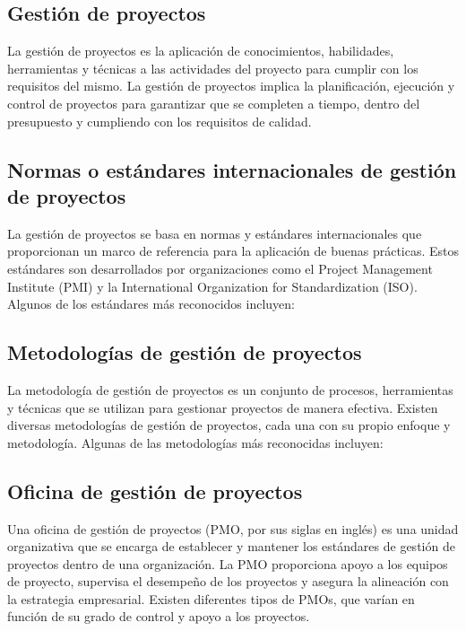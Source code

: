 \subsection{Gestión de proyectos}
La gestión de proyectos es la aplicación de conocimientos, habilidades, herramientas y técnicas a las actividades del proyecto para cumplir con los requisitos del mismo. La gestión de proyectos implica la planificación, ejecución y control de proyectos para garantizar que se completen a tiempo, dentro del presupuesto y cumpliendo con los requisitos de calidad.

\subsection{Normas o estándares internacionales de gestión de proyectos}
La gestión de proyectos se basa en normas y estándares internacionales que proporcionan un marco de referencia para la aplicación de buenas prácticas. Estos estándares son desarrollados por organizaciones como el Project Management Institute (PMI) y la International Organization for Standardization (ISO). Algunos de los estándares más reconocidos incluyen:

\subsection{Metodologías de gestión de proyectos}
La metodología de gestión de proyectos es un conjunto de procesos, herramientas y técnicas que se utilizan para gestionar proyectos de manera efectiva. Existen diversas metodologías de gestión de proyectos, cada una con su propio enfoque y metodología. Algunas de las metodologías más reconocidas incluyen:


\subsection{Oficina de gestión de proyectos}
Una oficina de gestión de proyectos (PMO, por sus siglas en inglés) es una unidad organizativa que se encarga de establecer y mantener los estándares de gestión de proyectos dentro de una organización. La PMO proporciona apoyo a los equipos de proyecto, supervisa el desempeño de los proyectos y asegura la alineación con la estrategia empresarial. Existen diferentes tipos de PMOs, que varían en función de su grado de control y apoyo a los proyectos.

